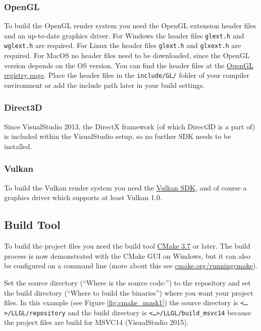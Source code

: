 \documentclass{article}
\begin{document}
\subsubsection{OpenGL}

To build the OpenGL render system you need the OpenGL extension header files and an up-to-date graphics driver.
For Windows the header files \texttt{glext.h} and \texttt{wglext.h} are required.
For Linux the header files \texttt{glext.h} and \texttt{glxext.h} are required.
For MacOS no header files need to be downloaded, since the OpenGL version depends on the OS version.
You can find the header files at the \href{https://www.opengl.org/registry/#headers}{OpenGL registry page}.
Place the header files in the \texttt{include/GL/} folder of your compiler environment
or add the include path later in your build settings.

\subsubsection{Direct3D}

Since VisualStudio 2013, the DirectX framework (of which Direct3D is a part of) is included within
the VisualStudio setup, so no further SDK needs to be installed.

\subsubsection{Vulkan}

To build the Vulkan render system you need the \href{https://lunarg.com/vulkan-sdk/}{Vulkan SDK},
and of course a graphics driver which supports at least Vulkan 1.0.

\newpage
\subsection{Build Tool}

To build the \LLGL project files you need the build tool \href{https://cmake.org/}{CMake 3.7} or later.
The build process is now demonstrated with the CMake GUI on Windows, but it can also be configured
on a command line (more about this see \href{https://cmake.org/runningcmake/}{cmake.org/runningcmake}).

Set the source directory (``Where is the source code:'') to the \LLGL repository
and set the build directory (``Where to build the binaries'') where you want your project files.
In this example (see Figure \ref{fig:cmake_mask1}) the source directory is \texttt{<\dots>/LLGL/repository}
and the build directory is \texttt{<\dots>/LLGL/build\_msvc14} because the project files are build
for MSVC14 (VisualStudio 2015).
\end{document}
